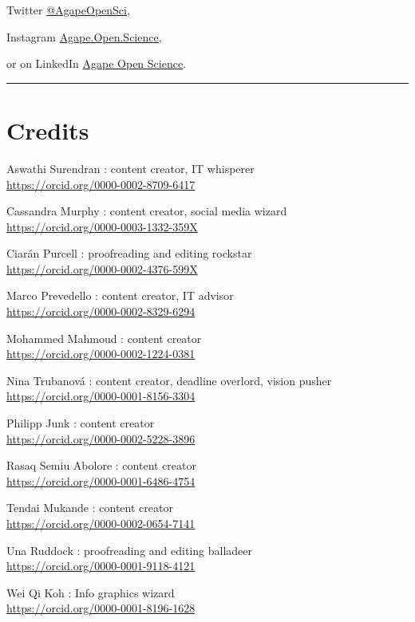 \documentclass[
]{book}
\begin{document}
Twitter {\href{https://twitter.com/AgapeOpenSci}{@AgapeOpenSci}},

Instagram {\href{https://www.instagram.com/Agape.Open.Science}{Agape.Open.Science}},

or on LinkedIn {\href{https://www.linkedin.com/company/agape-open-science/}{Agape Open Science}}.

\begin{center}\rule{0.5\linewidth}{0.5pt}\end{center}

\hypertarget{credits}{%
\section*{Credits}\label{credits}}

Aswathi Surendran : content creator, IT whisperer\\
\url{https://orcid.org/0000-0002-8709-6417}

Cassandra Murphy : content creator, social media wizard\\
\url{https://orcid.org/0000-0003-1332-359X}

Ciarán Purcell : proofreading and editing rockstar\\
\url{https://orcid.org/0000-0002-4376-599X}

Marco Prevedello : content creator, IT advisor ~\\
\url{https://orcid.org/0000-0002-8329-6294}

Mohammed Mahmoud : content creator\\
\url{https://orcid.org/0000-0002-1224-0381}

Nina Trubanová : content creator, deadline overlord, vision pusher\\
\url{https://orcid.org/0000-0001-8156-3304}

Philipp Junk : content creator\\
\url{https://orcid.org/0000-0002-5228-3896}

Rasaq Semiu Abolore : content creator\\
\url{https://orcid.org/0000-0001-6486-4754}

Tendai Mukande : content creator\\
\url{https://orcid.org/0000-0002-0654-7141}

Una Ruddock : proofreading and editing balladeer\\
\url{https://orcid.org/0000-0001-9118-4121}

Wei Qi Koh : Info graphics wizard\\
\url{https://orcid.org/0000-0001-8196-1628}
\end{document}
